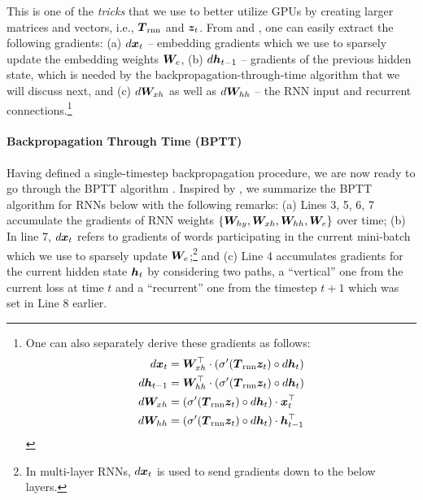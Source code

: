 This is one of the {\it tricks} that we use to better utilize GPUs by creating
larger matrices and vectors, i.e., $\mbox{\boldmath{$T$}}_{\text{rnn}}$ and $\bm{z}_{t}$. From  and
, one can easily extract the following gradients:
(a) $d\bm{x}_{t}$ -- embedding gradients which we use to sparsely update the embedding weights $\bm{W}_{e}$, (b) $d\bm{h}_{t-1}$
 -- gradients of the previous hidden state, which is needed by the
 backpropagation-through-time algorithm that we will discuss next, and (c) $d\bm{W}_{xh}$ as well
as $d\bm{W}_{hh}$ -- the RNN input and recurrent connections.\footnote{One can also
separately derive these gradients as follows:
\begin{align}
d\bm{x}_{t} &=  \bm{W}_{xh}^\top \cdot \left(\sigma'(\mbox{\boldmath{$T$}}_{\text{rnn}} \bm{z}_{t}) \circ d\bm{h}_{t}\right) \label{e:grad_xt}\\
d\bm{h}_{t-1} &=  \bm{W}_{hh}^\top \cdot \left(\sigma'(\mbox{\boldmath{$T$}}_{\text{rnn}} \bm{z}_{t}) \circ d\bm{h}_{t}\right)\\
d\bm{W}_{xh} &=  \left(\sigma'(\mbox{\boldmath{$T$}}_{\text{rnn}} \bm{z}_{t}) \circ d\bm{h}_{t}\right) \cdot \bm{x}_{t}^\top \\
d\bm{W}_{hh} &=  \left(\sigma'(\mbox{\boldmath{$T$}}_{\text{rnn}} \bm{z}_{t}) \circ d\bm{h}_{t}\right) \cdot \bm{h}_{t-1}^\top \label{e:grad_Whh}
\end{align}
}

\paragraph{Backpropagation Through Time (BPTT)}
Having defined a single-timestep backpropagation procedure, we are now ready to
go through the BPTT algorithm \cite{Rumelhart:1986:LPT,werbos1990}. Inspired by 
, we summarize the BPTT algorithm for RNNs below with the
following remarks: (a) Lines 3, 5, 6, 7 accumulate the gradients of RNN weights
$\{\bm{W}_{hy}, \bm{W}_{xh}, \bm{W}_{hh}, \bm{W}_{e}\}$ over time; (b) In line 7, $d\bm{x}_{t}$ refers to
gradients of words participating in the current mini-batch which we use to
sparsely update $\bm{W}_{e}$;\footnote{In multi-layer
RNNs, $d\bm{x}_{t}$ is used to send gradients down to the below layers.} and (c) Line
4 accumulates gradients for the current hidden state $\bm{h}_{t}$ by considering two paths,
a ``vertical'' one from  the current loss at time $t$ and a ``recurrent'' one from the timestep
$t+1$ which was set in Line 8 earlier.

